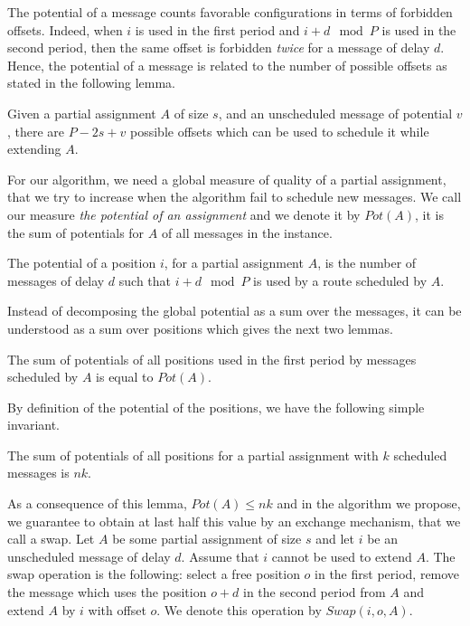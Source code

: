 \documentclass[a4paper,UKenglish,cleveref, autoref, thm-restate]{lipics-v2019}
\begin{document}
The potential of a message counts favorable configurations in terms of forbidden offsets.
Indeed, when $i$ is used in the first period and $i+d \mod P$ is used in the second period,
then the same offset is forbidden \emph{twice} for a message of delay $d$. Hence, the potential of a message is related to the number of possible offsets as stated in the following lemma. 

\begin{lemma}
Given a partial assignment $A$ of size $s$, and an unscheduled message of potential 
$v$, there are $P - 2s + v$ possible offsets which can be used to schedule it while extending $A$.
\end{lemma}

For our algorithm, we need a global measure of quality of a partial assignment, 
that we try to increase when the algorithm fail to schedule new messages. 
We call our measure \emph{the potential of an assignment} and we denote it by $Pot(A)$, it is the sum of potentials for $A$ of all messages in the instance.


\begin{definition}
The potential of a position $i$, for a partial assignment $A$, is the number of messages of delay $d$ such that $i+d \mod P$ is used by a route scheduled by $A$. 
\end{definition}

Instead of decomposing the global potential as a sum over the messages, it can be understood
as a sum over positions which gives the next two lemmas.

\begin{lemma}\label{lemma:pot_pos}
The sum of potentials of all positions used in the first period by messages scheduled by $A$ is equal to $Pot(A)$.  
\end{lemma}

By definition of the potential of the positions, we have the following simple invariant.

\begin{lemma}\label{lemma:inv}
The sum of potentials of all positions for a partial assignment with $k$ scheduled messages is $nk$.  
\end{lemma}

 As a consequence of this lemma, $Pot(A) \leq nk$ and in the algorithm we 
 propose, we guarantee to obtain at last half this value by an exchange mechanism, that we call a swap.
Let $A$ be some partial assignment of size $s$ and let $i$ be an unscheduled message of delay $d$. 
Assume that $i$ cannot be used to extend $A$. The swap operation is the following: 
select a free position $o$ in the first period, remove the message which uses the position $o+d$ in the second period from $A$ and extend $A$ by $i$ with offset $o$. We denote this operation by $Swap(i,o,A)$.
\end{document}

